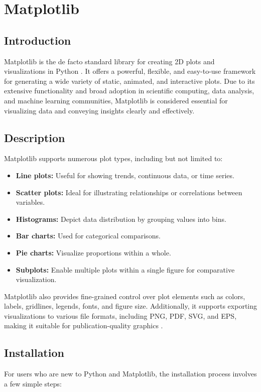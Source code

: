 \section{Matplotlib}

\subsection{Introduction}
Matplotlib is the de facto standard library for creating 2D plots and visualizations in Python \cite{hunter2007matplotlib}. It offers a powerful, flexible, and easy-to-use framework for generating a wide variety of static, animated, and interactive plots. Due to its extensive functionality and broad adoption in scientific computing, data analysis, and machine learning communities, Matplotlib is considered essential for visualizing data and conveying insights clearly and effectively.

\subsection{Description}
Matplotlib supports numerous plot types, including but not limited to:

\begin{itemize}
	\item \textbf{Line plots:} Useful for showing trends, continuous data, or time series.
	\item \textbf{Scatter plots:} Ideal for illustrating relationships or correlations between variables.
	\item \textbf{Histograms:} Depict data distribution by grouping values into bins.
	\item \textbf{Bar charts:} Used for categorical comparisons.
	\item \textbf{Pie charts:} Visualize proportions within a whole.
	\item \textbf{Subplots:} Enable multiple plots within a single figure for comparative visualization.
\end{itemize}

Matplotlib also provides fine-grained control over plot elements such as colors, labels, gridlines, legends, fonts, and figure size. Additionally, it supports exporting visualizations to various file formats, including PNG, PDF, SVG, and EPS, making it suitable for publication-quality graphics \cite{hunter2007matplotlib}.

\subsection{Installation}
For users who are new to Python and Matplotlib, the installation process involves a few simple steps:

